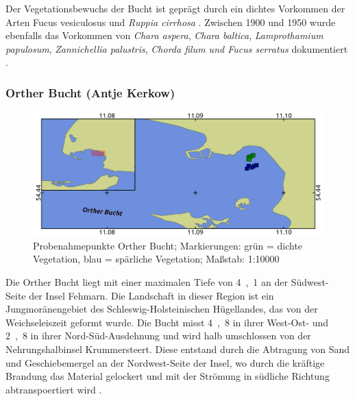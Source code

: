 Der Vegetationsbewuchs der Bucht ist geprägt durch ein dichtes Vorkommen der Arten Fucus vesiculosus und \textit{Ruppia cirrhosa} . Zwischen 1900 und 1950 wurde ebenfalls das Vorkommen von \textit{Chara aspera}, \textit{Chara baltica}, \textit{Lamprothamium papulosum}, \textit{Zannichellia palustris}, \textit{Chorda filum und Fucus serratus} dokumentiert \citep{mertens_2007}.


\subsubsection{Orther Bucht (Antje Kerkow)}

\begin{figure}[htb]
\centering
\includegraphics[width=1\textwidth]{images/OB.png}
\caption[Probenahmepunkte Orther Bucht]{Probenahmepunkte Orther Bucht; Markierungen: grün = dichte Vegetation, blau = spärliche Vegetation; Maßstab: 1:10000}
\label{OB}
\end{figure}



Die Orther Bucht liegt mit einer maximalen Tiefe von \unit{4,1}{\metre} \citep{seekarte_fehmarn_sund_kartograph_unbekannt_1902} an der Südwest- Seite der Insel Fehmarn. Die Landschaft in dieser Region ist ein Jungmoränengebiet des Schleswig-Holsteinischen Hügellandes, das von der Weichseleiszeit geformt wurde. Die Bucht misst \unit{4,8}{\kilo\metre} in ihrer West-Ost- und \unit{2,8}{\kilo\metre} in ihrer Nord-Süd-Ausdehnung und wird halb umschlossen von der Nehrungshalbinsel Krummersteert. Diese entstand durch die Abtragung von Sand und Geschiebemergel an der Nordwest-Seite der Insel, wo durch die kräftige Brandung das Material gelockert und mit der Strömung in südliche Richtung abtranspoertiert wird \citep{eschwe_2005}.


